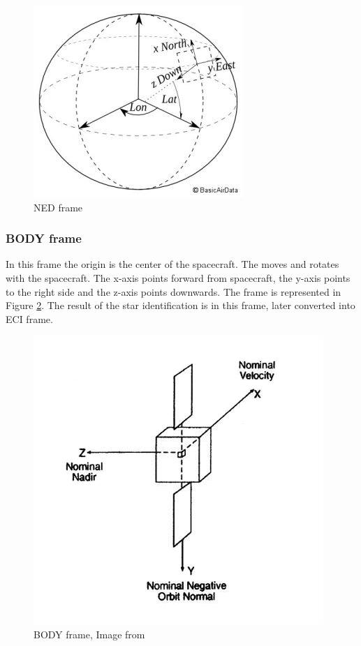 \documentclass[12pt,a4paper,twoside]{article}
\begin{document}
\begin{figure}[!htb]
\includegraphics[scale=0.6]{ned_frame.jpg}
\centering
\caption[NED frame]{NED frame \cite{ned-frame-image}}
\label{fig:ned_frame}
\end{figure}

\subsubsection{BODY frame}
In this frame the origin is the center of the spacecraft. The moves and rotates with the spacecraft. The x-axis points forward from spacecraft, the y-axis points to the right side and the z-axis points downwards. The frame is represented in Figure \ref{fig:body_frame}. The result of the star identification is in this frame, later converted into ECI frame.

\begin{figure}[!htb]
\includegraphics[scale=0.5]{body_frame.jpg}
\centering
\caption[BODY frame]{BODY frame, Image from \citet{larson1992space}}
\label{fig:body_frame}
\end{figure}
\end{document}
